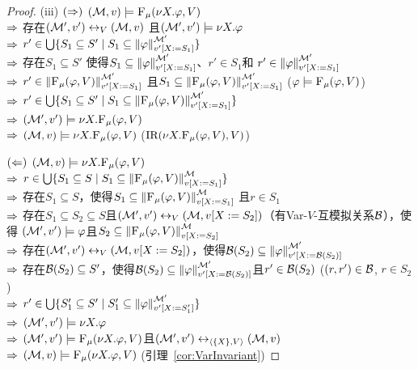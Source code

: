\begin{proof}
	
	(iii) $(\Rightarrow)$ $({\cal M},v) \models {\textsc{F}_{\textsc{$\mu$}}}(\nu X. \varphi, V)$\\
	$\Rightarrow$ 存在$({\cal M}', v') \leftrightarrow_V ({\cal M},v)$ 且$({\cal M}',v') \models \nu X. \varphi$\\
	$\Rightarrow$ $r' \in \bigcup \{S_1 \subseteq S' \mid S_1 \subseteq \left\|\varphi\right\|_{v'[X:=S_1]}^{{\cal M}'}\}$\\
	$\Rightarrow$ 存在$S_1 \subseteq S'$ 使得$S_1 \subseteq \left\|\varphi\right\|_{v'[X:=S_1]}^{{\cal M}'}$、$r'\in S_1$和 $r'\in \left\|\varphi\right\|_{v'[X:=S_1]}^{{\cal M}'}$\\
	$\Rightarrow$ $r' \in \left\|{\textsc{F}_{\textsc{$\mu$}}}(\varphi,V)\right\|_{v'[X:=S_1]}^{{\cal M}'}$ 且$S_1 \subseteq \left\|{\textsc{F}_{\textsc{$\mu$}}}(\varphi,V)\right\|_{v'[X:=S_1]}^{{\cal M}'}$ \hfill ($\varphi \models {\textsc{F}_{\textsc{$\mu$}}}(\varphi,V)$)\\
	$\Rightarrow$ $r'\in \bigcup \{S_1 \subseteq S' \mid S_1 \subseteq \left\|{\textsc{F}_{\textsc{$\mu$}}}(\varphi,V)\right\|_{v'[X:=S_1]}^{{\cal M}'}\}$\\
	$\Rightarrow$ $({\cal M}',v')\models \nu X. {\textsc{F}_{\textsc{$\mu$}}}(\varphi,V)$\\
	$\Rightarrow$ $({\cal M},v) \models \nu X. {\textsc{F}_{\textsc{$\mu$}}}(\varphi,V)$ \hfill  ($\textrm{IR}(\nu X. {\textsc{F}_{\textsc{$\mu$}}}(\varphi,V), V)$)
	
	$(\Leftarrow)$ $({\cal M},v)\models \nu X. {\textsc{F}_{\textsc{$\mu$}}}(\varphi,V)$\\
	$\Rightarrow$ $r\in \bigcup \{S_1 \subseteq S \mid S_1 \subseteq \left\|{\textsc{F}_{\textsc{$\mu$}}}(\varphi,V)\right\|_{v[X:=S_1]}^{{\cal M}}\}$\\
	$\Rightarrow$ 存在$S_1 \subseteq S$，使得$S_1 \subseteq \left\|{\textsc{F}_{\textsc{$\mu$}}}(\varphi,V)\right\|_{v[X:=S_1]}^{{\cal M}}$ 且$r \in S_1$\\
	$\Rightarrow$ 存在$S_1\subseteq S_2 \subseteq S$且$({\cal M}',v') \leftrightarrow_V ({\cal M},v[X:= S_2])$（有Var-$V$-互模拟关系${\cal B}$），使得 $({\cal M}',v')\models \varphi$且$S_2 \subseteq \left\|{\textsc{F}_{\textsc{$\mu$}}}(\varphi,V)\right\|_{v[X:=S_2]}^{{\cal M}}$\\
	$\Rightarrow$ 存在$({\cal M}',v') \leftrightarrow_V ({\cal M},v[X:= S_2])$，使得${\cal B}(S_2) \subseteq \left\|\varphi\right\|_{v'[X:={\cal B}(S_2)]}^{{\cal M}'}$\\
	$\Rightarrow$ 存在${\cal B}(S_2) \subseteq S'$，使得${\cal B}(S_2) \subseteq \left\|\varphi\right\|_{v'[X:={\cal B}(S_2)]}^{{\cal M}'}$且$r'\in {\cal B}(S_2)$ \hfill ($(r,r')\in {\cal B}$, $r \in S_2$) \\
	$\Rightarrow$ $r'\in \bigcup \{S_1' \subseteq S' \mid S_1' \subseteq \left\|\varphi\right\|_{v'[X:=S_1']}^{{\cal M}'}\}$\\
	$\Rightarrow$ $({\cal M}',v') \models \nu X. \varphi$ \\ %
	$\Rightarrow$ $({\cal M}',v') \models {\textsc{F}_{\textsc{$\mu$}}}(\nu X. \varphi, V)$且$({\cal M}',v') \leftrightarrow_{{\langle{\{X\},V}\rangle}} ({\cal M},v)$\\
	$\Rightarrow$ $({\cal M}, v) \models {\textsc{F}_{\textsc{$\mu$}}}(\nu X. \varphi, V)$ \hfill (引理~\ref{cor:VarInvariant})
	

\end{proof}
